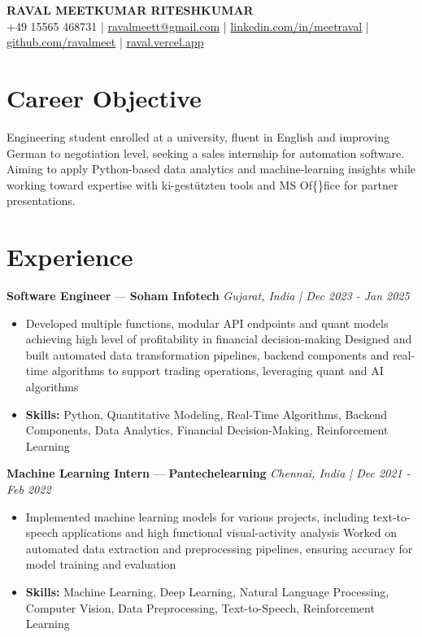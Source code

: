 \documentclass[a4paper,10pt]{article}
\begin{document}
\begin{center}
  {\Large\bfseries RAVAL MEETKUMAR RITESHKUMAR}\\[2pt]
  {\small +49 15565 468731 \;|\; \href{mailto:ravalmeett@gmail.com}{ravalmeett@gmail.com} \;|\; \href{https://www.linkedin.com/in/meetraval/}{linkedin.com/in/meetraval} \;|\; \href{https://github.com/ravalmeet}{github.com/ravalmeet} \;|\; \href{https://raval.vercel.app/}{raval.vercel.app}}
\end{center}
\vspace{-3pt}

\section*{Career Objective}
Engineering student enrolled at a university, fluent in English and improving German to negotiation level, seeking a sales internship for automation software. Aiming to apply Python-based data analytics and machine-learning insights while working toward expertise with ki-gestützten tools and MS Of\{\}fice for partner presentations.\par

\section*{Experience}
\textbf{Software Engineer} — \textbf{Soham Infotech} \hfill \textit{Gujarat, India \;|\; Dec 2023 - Jan 2025}\par
\vspace{1pt}
\begin{itemize}
  \item Developed multiple functions, modular API endpoints and quant models achieving high level of profitability in financial decision-making Designed and built automated data transformation pipelines, backend components and real-time algorithms to support trading operations, leveraging quant and AI algorithms
  \item \textbf{Skills:} Python, Quantitative Modeling, Real-Time Algorithms, Backend Components, Data Analytics, Financial Decision-Making, Reinforcement Learning
\end{itemize}
\vspace{3pt}
\textbf{Machine Learning Intern} — \textbf{Pantechelearning} \hfill \textit{Chennai, India \;|\; Dec 2021 - Feb 2022}\par
\vspace{1pt}
\begin{itemize}
  \item Implemented machine learning models for various projects, including text-to-speech applications and high functional visual-activity analysis Worked on automated data extraction and preprocessing pipelines, ensuring accuracy for model training and evaluation
  \item \textbf{Skills:} Machine Learning, Deep Learning, Natural Language Processing, Computer Vision, Data Preprocessing, Text-to-Speech, Reinforcement Learning
\end{itemize}
\end{document}
